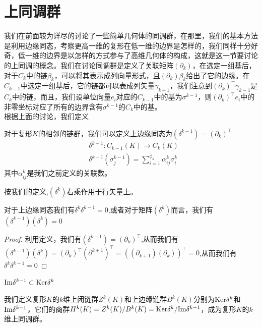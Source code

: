 \section{上同调群}
我们在前面较为详尽的讨论了一些简单几何体的同调群，在那里，我们的基本方法是利用边缘同态，考察更高一维的复形在低一维的边界是怎样的，我们同样十分好奇，低一维的边界是以怎样的方式参与了高维几何体的构成，这就是这一节要讨论的上同调的概念。我们在讨论同调群是定义了关联矩阵$(\partial_{k})$，在选定一组基后，对于$C_{k}$中的链$\beta_{k}$，可以将其表示成列向量形式，且$(\partial_{k})\beta_{k}$给出了它的边缘。在$C_{k-1}$中选定一组基后，它的链都可以表成列矢量$\gamma_{k-1}$，我们注意到$(\partial_{k})^{\top}\gamma_{k-1}$是$C_{k}$中的链，而且，我们设单位向量$e_{i}$对应的$C_{k-1}$中的基为$\sigma^{k-1}$，则$(\partial_{k})^{\top}e_{i}$中的非零坐标对应了所有的边界含有$\sigma^{k-1}$的$C_{k}$中的基。\\
根据上面的讨论，我们定义
\begin{definition}[上边缘同态]
对于复形$K$的相邻的链群，我们可以定义上边缘同态为$(\delta^{k-1})=(\partial_{k})^{\top}$\\
\begin{equation*}
\begin{aligned}
    &\delta^{k-1}:C_{k-1}(K)\rightarrow C_{k}(K)\\
    &\delta^{k-1}(\sigma^{k-1}_{j})=\sum\limits_{i=1}^{\phi_{k}}\alpha_{ij}^{k}\sigma^{k}_{i}
\end{aligned}
\end{equation*}
其中$\alpha_{ij}^{k}$是我们之前定义的关联数。
\end{definition}
按我们的定义,$(\delta^{k})$右乘作用于行矢量上。
\begin{proposition}
对于上边缘同态我们有$\delta^{k}\delta^{k-1}=0$,或者对于矩阵$(\delta^{k})$而言，我们有$(\delta^{k-1})(\delta^{k})=0$
\end{proposition}
\begin{proof}
利用定义，我们有$(\delta^{k-1})=(\partial_{k})^{\top}$,从而我们有$(\delta^{k-1})(\delta^{k})=(\partial_{k})^{\top}(\partial^{k+1})^{\top}=((\partial_{k+1})(\partial_{k}))^{\top}=0$,从而我们有$\delta^{k}\delta^{k-1}=0$
\end{proof}
\begin{corollary}
${\rm Im}\delta^{k-1}\subset {\rm Ker}\delta^{k}$
\end{corollary}
\begin{definition}
我们定义复形$K$的$k$维上闭链群$Z^{k}(K)$和上边缘链群$B^{k}(K)$分别为${\rm Ker}\delta^{k}$和${\rm Im}\delta^{k-1}$，它们的商群$H^{k}(K)=Z^{k}(K)/B^{k}(K)={\rm Ker}\delta^{k}/{\rm Im}\delta^{k-1}$，成为复形$K$的$k$维上同调群。
\end{definition}
